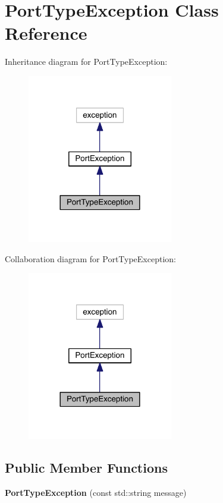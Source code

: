 \hypertarget{class_port_type_exception}{}\section{Port\+Type\+Exception Class Reference}
\label{class_port_type_exception}


Inheritance diagram for Port\+Type\+Exception\+:
\nopagebreak
\begin{figure}[H]
\begin{center}
\leavevmode
\includegraphics[width=180pt]{class_port_type_exception__inherit__graph}
\end{center}
\end{figure}


Collaboration diagram for Port\+Type\+Exception\+:
\nopagebreak
\begin{figure}[H]
\begin{center}
\leavevmode
\includegraphics[width=180pt]{class_port_type_exception__coll__graph}
\end{center}
\end{figure}
\subsection*{Public Member Functions}
\begin{DoxyCompactItemize}
\item 
\hypertarget{class_port_type_exception_aa3154797084de9cfe74b653bf3e63ee2}{}\label{class_port_type_exception_aa3154797084de9cfe74b653bf3e63ee2} 
{\bfseries Port\+Type\+Exception} (const std\+::string message)
\end{DoxyCompactItemize}


